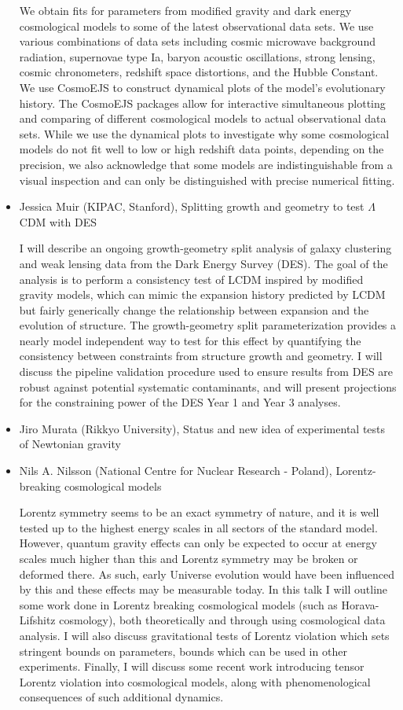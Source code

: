 \documentclass[letterpaper,12pt]{article}
\newcommand{\talk}[2]{{\fontspec{Lato Bold} #1,} {\fontspec{Lato Italic} #2}}
\begin{document}
\begin{itemize}
We obtain fits for parameters from modified gravity and dark energy cosmological models to some of the latest observational data sets.  We use various combinations of data sets including cosmic microwave background radiation, supernovae type Ia, baryon acoustic oscillations, strong lensing, cosmic chronometers, redshift space distortions, and the Hubble Constant.  We use CosmoEJS to construct dynamical plots of the model's evolutionary history.  The CosmoEJS packages allow for interactive simultaneous plotting and comparing of different cosmological models to actual observational data sets. While we use the dynamical plots to investigate why some cosmological models do not fit well to low or high redshift data points, depending on the precision, we also acknowledge that some models are indistinguishable from a visual inspection and can only be distinguished with precise numerical fitting. 


\item \talk{Jessica Muir (KIPAC, Stanford)}{Splitting growth and geometry to test $\Lambda$CDM with DES}

I will describe an ongoing growth-geometry split analysis of galaxy clustering and weak lensing data from the Dark Energy Survey (DES). The goal of the analysis is to perform a consistency test of LCDM inspired by modified gravity models, which can mimic the expansion history predicted by LCDM but fairly generically change the relationship between expansion and the evolution of structure. The growth-geometry split parameterization provides a nearly model independent way to test for this effect by quantifying the consistency between constraints from structure growth and geometry. I will discuss the pipeline validation procedure used to ensure results from DES are robust against potential systematic contaminants, and will present projections for the constraining power of the DES Year 1 and Year 3 analyses.


\item \talk{Jiro Murata (Rikkyo University)}{Status and new idea of experimental tests of Newtonian gravity}


\item \talk{Nils A. Nilsson (National Centre for Nuclear Research - Poland)}{Lorentz-breaking cosmological models}

Lorentz symmetry seems to be an exact symmetry of nature, and it is well tested up to the highest energy scales in all sectors of the standard model. However, quantum gravity effects can only be expected to occur at energy scales much higher than this and Lorentz symmetry may be broken or deformed there. As such, early Universe evolution would have been influenced by this and these effects may be measurable today.
In this talk I will outline some work done in Lorentz breaking cosmological models (such as Horava-Lifshitz cosmology), both theoretically and through using cosmological data analysis. I will also discuss gravitational tests of Lorentz violation which sets stringent bounds on parameters, bounds which can be used in other experiments. Finally, I will discuss some recent work introducing tensor Lorentz violation into cosmological models, along with phenomenological consequences of such additional dynamics.



\end{itemize}
\end{document}
